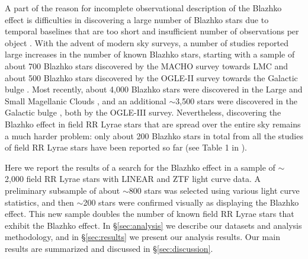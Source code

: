 A part of the reason for incomplete observational description of the Blazhko effect is difficulties in discovering a large number 
of Blazhko stars due to temporal baselines that are too short and insufficient number of observations per object
\citep{2016CoKon.105...61K,2022ApJS..258....4H}. With the advent of modern sky surveys, a number of studies
reported large increases in the number of known Blazhko stars, starting with a sample of about 700 Blazhko
stars discovered by the MACHO survey towards LMC \citep{2003ApJ...598..597A} and about 500 Blazhko stars
discovered by the OGLE-II survey towards the Galactic bulge \citep{2003AcA....53..307M}. 
Most recently,  about 4,000 Blazhko stars were discovered in the Large and Small Magellanic Clouds
\citep{2009AcA....59....1S, 2010AcA....60..165S}, and an additional $\sim$3,500 stars were discovered in the
Galactic bulge \citep{2011AcA....61....1S}, both by the OGLE-III survey. Nevertheless, discovering the Blazhko
effect in field RR Lyrae stars that are spread over the entire sky remains a much harder problem: only about
200 Blazhko stars in total from all the studies of field RR Lyrae stars have been reported so far (see Table 1
in \citealt{2016CoKon.105...61K}). 

Here we report the results of a search for the Blazhko effect in a sample of $\sim$2,000 field RR Lyrae stars with
LINEAR and ZTF light curve data. A preliminary subsample of about $\sim$800 stars was selected using various
light curve statistics, and then $\sim$200 stars were confirmed visually as displaying the Blazhko effect. This new
sample doubles the number of known field RR Lyrae stars that exhibit the Blazhko effect. In \S\ref{sec:analysis}
we describe our datasets and analysis methodology, and in \S\ref{sec:results} we present our analysis results. 
Our main results are summarized and discussed in \S\ref{sec:discussion}. 





